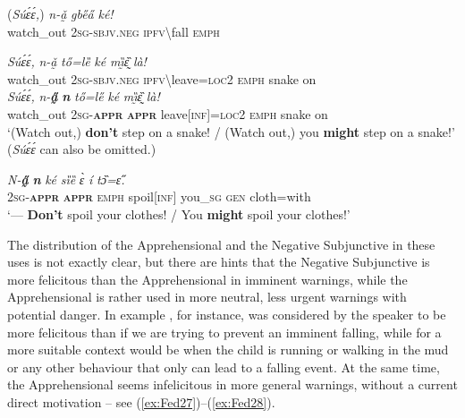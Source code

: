 \documentclass[output=paper,colorlinks,citecolor=brown]{langscibook}
\begin{document}
\ea \label{ex:Fed24}
\ea \label{ex:Fed24a}
\gll \textup{(}\textit{Súɛ́ɛ́,}\textup{)} \textit{n-ǎ̰} \textit{gbe̋a̋} \textit{ké!} \\
watch\_out \textsc{2sg-sbjv.neg} \textsc{ipfv}\backslash fall \textsc{emph} \\
\z
\z


\ea \label{ex:Fed25}
\ea \label{ex:Fed25a}
\gll \textit{Súɛ́ɛ́,} \textit{n-ǎ̰} \textit{tő=lȅ} \textit{ké} \textit{mı̰̏ɛ̰̏} \textit{là!} \\
watch\_out \textsc{2sg-sbjv.neg} \textsc{ipfv}\backslash leave=\textsc{loc2} \textsc{emph} snake on \\
\ex \label{ex:Fed25b}
\gll \textit{Súɛ́ɛ́,} \textit{n-\textbf{a̰̋}} \textit{\textbf{n{\ù}}} \textit{tő=le̋} \textit{ké} \textit{mı̰̏ɛ̰̏} \textit{là!} \\
watch\_out \textsc{2sg-\textbf{appr}} \textsc{\textbf{appr}} leave\textsc{[inf]=loc2} \textsc{emph} snake on \\
\glt `(Watch out,) \textbf{don't} step on a snake! / (Watch out,) you \textbf{might} step on a snake!' (\textit{Súɛ́ɛ́} can also be omitted.)
\z
\z



\ea \label{ex:Fed26}
\gll \textit{N-\textbf{a̰̋}} \textit{\textbf{n{\ù}}} \textit{ké} \textit{sȉȅ} \textit{ɛ̀} \textit{í} \textit{tɔ̏=ɛ̋.} \\
\textsc{2sg-\textbf{appr}} \textsc{\textbf{appr}} \textsc{emph} spoil[\textsc{inf}] you\_\textsc{sg} \textsc{gen} cloth=with \\
 `--- \textbf{Don't} spoil your clothes! / You \textbf{might} spoil your clothes!'
\z

 The distribution of the Apprehensional and the Negative Subjunctive in these uses is not exactly clear, but there are hints that the Negative Subjunctive is more felicitous than the Apprehensional in imminent warnings, while the Apprehensional is rather used in more neutral, less urgent warnings with potential danger. In example , for instance,  was considered by the speaker to be more felicitous than  if we are trying to prevent an imminent falling, while for  a more suitable context would be when the child is running or walking in the mud or any other behaviour that only can lead to a falling event. At the same time, the Apprehensional seems infelicitous in more general warnings, without a current direct motivation -- see (\ref{ex:Fed27})--(\ref{ex:Fed28}).
\end{document}
